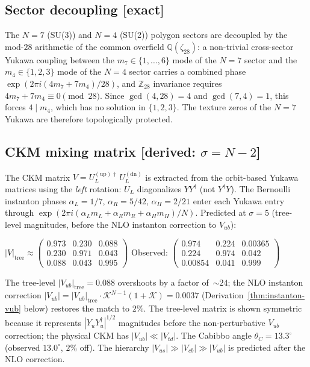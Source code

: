 \subsection{Sector decoupling \textnormal{[exact]}}
\label{sec:decoupling}

The $N = 7$ (SU(3)) and $N = 4$ (SU(2)) polygon sectors are
decoupled by the mod-$28$ arithmetic of the common overfield
$\mathbb{Q}(\zeta_{28})$: a non-trivial cross-sector Yukawa
coupling between the $m_7 \in \{1,\ldots,6\}$ mode of the
$N=7$ sector and the $m_4 \in \{1,2,3\}$ mode of the $N=4$
sector carries a combined phase
$\exp(2\pi i(4m_7 + 7m_4)/28)$,
and $\mathbb{Z}_{28}$ invariance requires
$4m_7 + 7m_4 \equiv 0 \pmod{28}$.
Since $\gcd(4, 28) = 4$ and $\gcd(7, 4) = 1$, this forces
$4 \mid m_4$, which has no solution in $\{1,2,3\}$.
The texture zeros of the $N = 7$ Yukawa are therefore
topologically protected.

\subsection{CKM mixing matrix \textnormal{[derived: $\sigma = N{-}2$]}}
\label{sec:ckm-tree}

The CKM matrix $V = U_L^{(\mathrm{up})\dagger}\,U_L^{(\mathrm{dn})}$
is extracted from the orbit-based Yukawa matrices
using the \emph{left} rotation: $U_L$ diagonalizes $YY^\dagger$
(not $Y^\dagger Y$).
The Bernoulli instanton phases
$\alpha_L = 1/7$, $\alpha_R = 5/42$, $\alpha_H = 2/21$
enter each Yukawa entry through
$\exp(2\pi i(\alpha_L m_L + \alpha_R m_R + \alpha_H m_H)/N)$.
Predicted at $\sigma = 5$
(tree-level magnitudes, before the NLO instanton correction to $V_{ub}$):
\begin{center}
\small
$|V|_{\mathrm{tree}} \approx \begin{pmatrix}
  0.973 & 0.230 & 0.088 \\
  0.230 & 0.971 & 0.043 \\
  0.088 & 0.043 & 0.995
\end{pmatrix}$
\qquad
Observed: $\begin{pmatrix}
  0.974 & 0.224 & 0.00365 \\
  0.224 & 0.974 & 0.042 \\
  0.00854 & 0.041 & 0.999
\end{pmatrix}$
\end{center}
\noindent
The tree-level $|V_{ub}|_{\mathrm{tree}} = 0.088$ overshoots by
a factor of~$\sim\!24$; the NLO instanton correction
$|V_{ub}| = |V_{ub}|_{\mathrm{tree}} \cdot \mathcal{K}^{N-1}(1+\mathcal{K})
= 0.0037$
(Derivation~\ref{thm:instanton-vub} below) restores the match to $2\%$.
The tree-level matrix is shown symmetric because it represents
$|Y_u Y_u^\dagger|^{1/2}$ magnitudes before the non-perturbative
$V_{ub}$ correction; the physical CKM has $|V_{ub}| \ll |V_{td}|$.
The Cabibbo angle $\theta_C = 13.3^\circ$ (observed $13.0^\circ$,
$2\%$ off).
The hierarchy $|V_{us}| \gg |V_{cb}| \gg |V_{ub}|$ is predicted
after the NLO correction.

